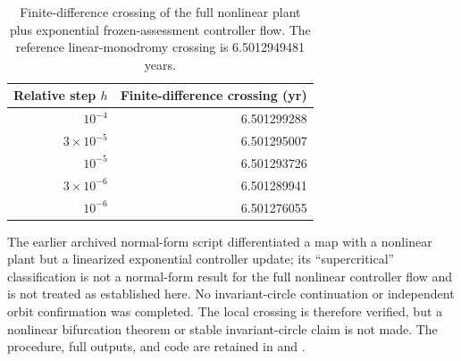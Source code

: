 \begin{table}[htbp]
\centering\small
\caption{Finite-difference crossing of the full nonlinear plant plus exponential frozen-assessment controller flow. The reference linear-monodromy crossing is 6.5012949481 years.}
\label{tab:nonlinear-flow-check}
\begin{tabular}{@{}rr@{}}
\toprule Relative step \(h\) & Finite-difference crossing (yr) \\
\midrule
\(10^{-4}\) & 6.501299288 \\
\(3\times10^{-5}\) & 6.501295007 \\
\(10^{-5}\) & 6.501293726 \\
\(3\times10^{-6}\) & 6.501289941 \\
\(10^{-6}\) & 6.501276055 \\
\bottomrule
\end{tabular}
\end{table}

The earlier archived normal-form script differentiated a map with a nonlinear plant but a linearized exponential controller update; its ``supercritical'' classification is not a normal-form result for the full nonlinear controller flow and is not treated as established here. No invariant-circle continuation or independent orbit confirmation was completed. The local crossing is therefore verified, but a nonlinear bifurcation theorem or stable invariant-circle claim is not made. The procedure, full outputs, and code are retained in \texttt{} and \texttt{}.

